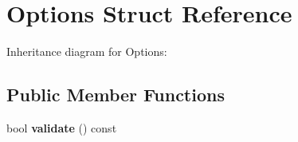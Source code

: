 \hypertarget{structOptions}{}\section{Options Struct Reference}
\label{structOptions}


Inheritance diagram for Options\+:
\subsection*{Public Member Functions}
\begin{DoxyCompactItemize}
\item 
bool {\bfseries validate} () const \hypertarget{structOptions_a0a376f3c34edd6b86db2ec91f2a94465}{}\label{structOptions_a0a376f3c34edd6b86db2ec91f2a94465}

\end{DoxyCompactItemize}
